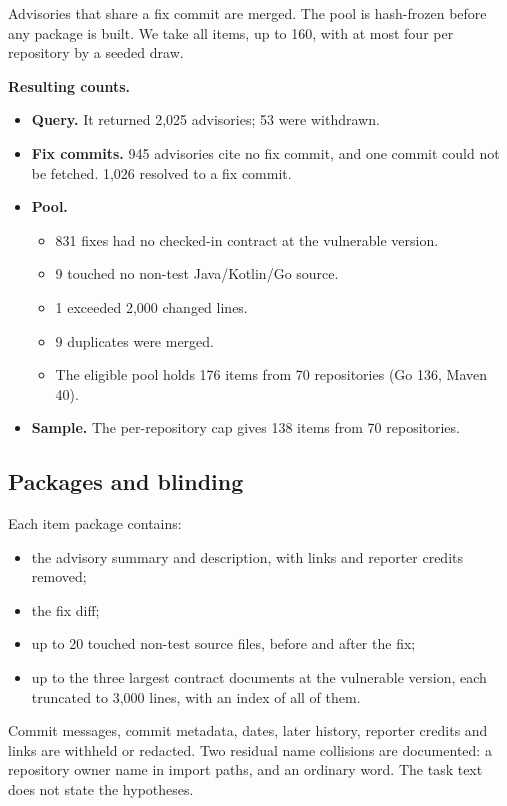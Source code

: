 \documentclass[conference]{IEEEtran}
\begin{document}
Advisories that share a fix commit are merged. The pool is hash-frozen before any package is built. We take all items, up to 160, with at most four per repository by a seeded draw.

\textbf{Resulting counts.}
\begin{itemize}
\item \textbf{Query.} It returned 2,025 advisories; 53 were withdrawn.
\item \textbf{Fix commits.} 945 advisories cite no fix commit, and one commit could not be fetched. 1,026 resolved to a fix commit.
\item \textbf{Pool.}
\begin{itemize}
\item 831 fixes had no checked-in contract at the vulnerable version.
\item 9 touched no non-test Java/Kotlin/Go source.
\item 1 exceeded 2,000 changed lines.
\item 9 duplicates were merged.
\item The eligible pool holds 176 items from 70 repositories (Go 136, Maven 40).
\end{itemize}
\item \textbf{Sample.} The per-repository cap gives 138 items from 70 repositories.
\end{itemize}

\subsection{Packages and blinding}
Each item package contains:
\begin{itemize}
\item the advisory summary and description, with links and reporter credits removed;
\item the fix diff;
\item up to 20 touched non-test source files, before and after the fix;
\item up to the three largest contract documents at the vulnerable version, each truncated to 3,000 lines, with an index of all of them.
\end{itemize}

Commit messages, commit metadata, dates, later history, reporter credits and links are withheld or redacted. Two residual name collisions are documented: a repository owner name in import paths, and an ordinary word. The task text does not state the hypotheses.
\end{document}
